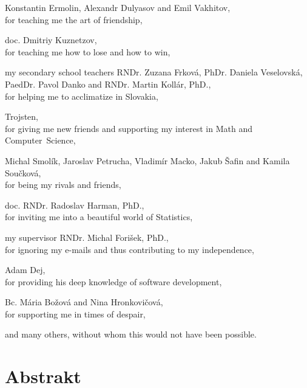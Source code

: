 \documentclass[12pt, oneside]{book}
\def\ack#1#2{#1,\\#2\smallskip}
\begin{document}
\ack{Konstantin Ermolin, Alexandr Dulyasov and Emil Vakhitov}{for teaching me the art of friendship,}

\ack{doc. Dmitriy Kuznetzov}{for teaching me how to lose and how to win,}

\ack{my secondary school teachers RNDr. Zuzana Frková, PhDr. Daniela Veselovská, PaedDr. Pavol Danko and RNDr. Martin Kollár, PhD.}
{for helping me to acclimatize in Slovakia,}

\ack{Trojsten}{for giving me new friends and supporting my interest in Math and Computer~Science,}

\ack{Michal Smolík, Jaroslav Petrucha, Vladimír Macko, Jakub Šafin and Kamila Součková}{for being
my rivals and friends,}

\ack{doc. RNDr. Radoslav Harman, PhD.}{for inviting me into a beautiful world of Statistics,}

\ack{my supervisor RNDr. Michal Forišek, PhD.}{for ignoring my e-mails and thus contributing to my independence,}

\ack{Adam Dej}{for providing his deep knowledge of software development,}

\ack{Bc. Mária Božová and Nina Hronkovičová}{for supporting me in times of despair,}

and many others, without whom this would not have been possible.

\vfill


\newpage 
\section*{Abstrakt}

\end{document}
